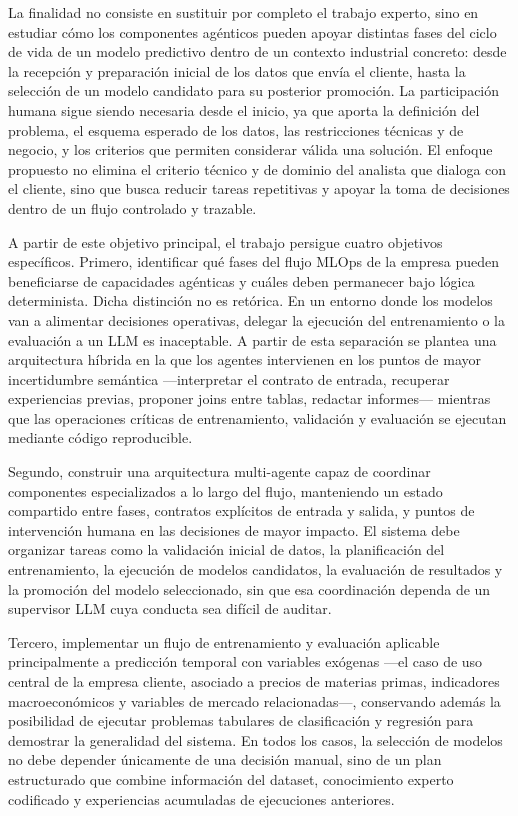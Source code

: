\documentclass[12pt,a4paper]{article}
\theoremstyle{plain}
\begin{document}
La finalidad no consiste en sustituir por completo el trabajo experto, sino en estudiar cómo los componentes agénticos pueden apoyar distintas fases del ciclo de vida de un modelo predictivo dentro de un contexto industrial concreto: desde la recepción y preparación inicial de los datos que envía el cliente, hasta la selección de un modelo candidato para su posterior promoción. La participación humana sigue siendo necesaria desde el inicio, ya que aporta la definición del problema, el esquema esperado de los datos, las restricciones técnicas y de negocio, y los criterios que permiten considerar válida una solución. El enfoque propuesto no elimina el criterio técnico y de dominio del analista que dialoga con el cliente, sino que busca reducir tareas repetitivas y apoyar la toma de decisiones dentro de un flujo controlado y trazable.

\noindent A partir de este objetivo principal, el trabajo persigue cuatro objetivos específicos. Primero, identificar qué fases del flujo MLOps de la empresa pueden beneficiarse de capacidades agénticas y cuáles deben permanecer bajo lógica determinista. Dicha distinción no es retórica. En un entorno donde los modelos van a alimentar decisiones operativas, delegar la ejecución del entrenamiento o la evaluación a un LLM es inaceptable. A partir de esta separación se plantea una arquitectura híbrida en la que los agentes intervienen en los puntos de mayor incertidumbre semántica ---interpretar el contrato de entrada, recuperar experiencias previas, proponer joins entre tablas, redactar informes--- mientras que las operaciones críticas de entrenamiento, validación y evaluación se ejecutan mediante código reproducible.

Segundo, construir una arquitectura multi-agente capaz de coordinar componentes especializados a lo largo del flujo, manteniendo un estado compartido entre fases, contratos explícitos de entrada y salida, y puntos de intervención humana en las decisiones de mayor impacto. El sistema debe organizar tareas como la validación inicial de datos, la planificación del entrenamiento, la ejecución de modelos candidatos, la evaluación de resultados y la promoción del modelo seleccionado, sin que esa coordinación dependa de un supervisor LLM cuya conducta sea difícil de auditar.

Tercero, implementar un flujo de entrenamiento y evaluación aplicable principalmente a predicción temporal con variables exógenas ---el caso de uso central de la empresa cliente, asociado a precios de materias primas, indicadores macroeconómicos y variables de mercado relacionadas---, conservando además la posibilidad de ejecutar problemas tabulares de clasificación y regresión para demostrar la generalidad del sistema. En todos los casos, la selección de modelos no debe depender únicamente de una decisión manual, sino de un plan estructurado que combine información del dataset, conocimiento experto codificado y experiencias acumuladas de ejecuciones anteriores.
\end{document}
